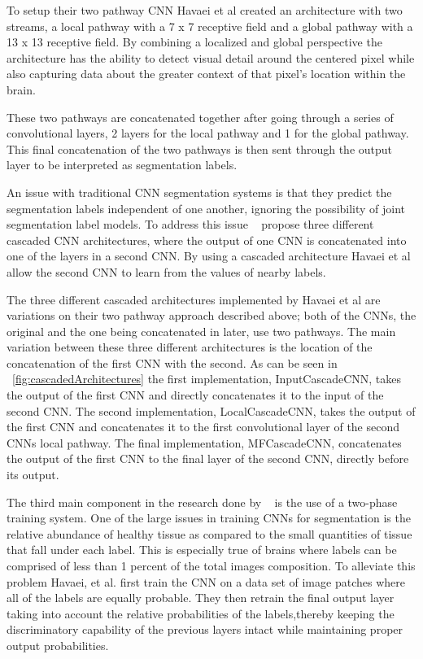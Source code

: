 \documentclass{sig-alternate}
\begin{document}
To setup their two pathway CNN Havaei et al created an architecture with two streams, a local pathway with a 7 x 7 receptive field and a global pathway with a 13 x 13 receptive field. By combining a localized and global perspective the architecture has the ability to detect visual detail around the centered pixel while also capturing data about the greater context of that pixel's location within the brain.

These two pathways are concatenated together after going through a series of convolutional layers, 2 layers for the local pathway and 1 for the global pathway. This final concatenation of the two pathways is then sent through the output layer to be interpreted as segmentation labels.

An issue with traditional CNN segmentation systems is that they predict the segmentation labels independent of one another, ignoring the possibility of joint segmentation label models. To address this issue ~\cite{Havaei:2017} propose three different cascaded CNN architectures, where the output of one CNN is concatenated into one of the layers in a second CNN. By using a cascaded architecture Havaei et al allow the second CNN to learn from the values of nearby labels.

\begin{figure*}
\centering
{}
\caption{The three different "cascaded" architectures used by Havaei, et al. ~\cite{Havaei:2017}}
\label{fig:cascadedArchitectures}
\end{figure*}

The three different cascaded architectures implemented by Havaei et al are variations on their two pathway approach described above; both of the CNNs, the original and the one being concatenated in later, use two pathways. The main variation between these three different architectures is the location of the concatenation of the first CNN with the second. As can be seen in ~\ref{fig:cascadedArchitectures} the first implementation, InputCascadeCNN, takes the output of the first CNN and directly concatenates it to the input of the second CNN. The second implementation, LocalCascadeCNN, takes the output of the first CNN and concatenates it to the first convolutional layer of the second CNNs local pathway. The final implementation, MFCascadeCNN, concatenates the output of the first CNN to the final layer of the second CNN, directly before its output.

The third main component in the research done by ~\cite{Havaei:2017} is the use of a two-phase training system. One of the large issues in training CNNs for segmentation is the relative abundance of healthy tissue as compared to the small quantities of tissue that fall under each label. This is especially true of brains where labels can be comprised of less than 1 percent of the total images composition. To alleviate this problem Havaei, et al. first train the CNN on a data set of image patches where all of the labels are equally probable. They then retrain the final output layer taking into account the relative probabilities of the labels,thereby keeping the discriminatory capability of the previous layers intact while maintaining proper output probabilities.
\end{document}
